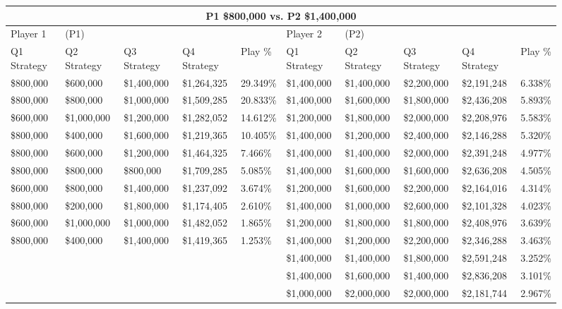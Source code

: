 \documentclass[11pt]{article}
\begin{document}
\begin{figure}
\tiny
\begin{tabular}{ |p{1.0cm}p{1.0cm}p{1.0cm}p{2.0cm}|p{1.0cm}||p{1.0cm}p{1.0cm}p{1.0cm}p{2.0cm}|p{1.0cm}|}
\hline
\multicolumn{10}{|c|}{P1 \$800,000 vs. P2 \$1,400,000} \\
\hline
Player 1 & (P1) & & & & Player 2 & (P2) & & & \\
\hline
Q1 Strategy & Q2 Strategy & Q3 Strategy & Q4 Strategy  &  Play \% & Q1 Strategy & Q2 Strategy & Q3 Strategy & Q4 Strategy  &  Play \%\\
\hline
\$800,000 & \$600,000 & \$1,400,000 & \$1,264,325 & 29.349\% & \$1,400,000 & \$1,400,000 & \$2,200,000 & \$2,191,248 & 6.338\% \\
\$800,000 & \$800,000 & \$1,000,000 & \$1,509,285 & 20.833\% & \$1,400,000 & \$1,600,000 & \$1,800,000 & \$2,436,208 & 5.893\% \\
\$600,000 & \$1,000,000 & \$1,200,000 & \$1,282,052 & 14.612\% & \$1,200,000 & \$1,800,000 & \$2,000,000 & \$2,208,976 & 5.583\% \\
\$800,000 & \$400,000 & \$1,600,000 & \$1,219,365 & 10.405\% & \$1,400,000 & \$1,200,000 & \$2,400,000 & \$2,146,288 & 5.320\% \\
\$800,000 & \$600,000 & \$1,200,000 & \$1,464,325 & 7.466\% & \$1,400,000 & \$1,400,000 & \$2,000,000 & \$2,391,248 & 4.977\% \\
\$800,000 & \$800,000 & \$800,000 & \$1,709,285 & 5.085\% & \$1,400,000 & \$1,600,000 & \$1,600,000 & \$2,636,208 & 4.505\% \\
\$600,000 & \$800,000 & \$1,400,000 & \$1,237,092 & 3.674\% & \$1,200,000 & \$1,600,000 & \$2,200,000 & \$2,164,016 & 4.314\% \\
\$800,000 & \$200,000 & \$1,800,000 & \$1,174,405 & 2.610\% & \$1,400,000 & \$1,000,000 & \$2,600,000 & \$2,101,328 & 4.023\% \\
\$600,000 & \$1,000,000 & \$1,000,000 & \$1,482,052 & 1.865\% & \$1,200,000 & \$1,800,000 & \$1,800,000 & \$2,408,976 & 3.639\% \\
\$800,000 & \$400,000 & \$1,400,000 & \$1,419,365 & 1.253\% & \$1,400,000 & \$1,200,000 & \$2,200,000 & \$2,346,288 & 3.463\% \\
& & & & & \$1,400,000 & \$1,400,000 & \$1,800,000 & \$2,591,248 & 3.252\% \\
& & & & & \$1,400,000 & \$1,600,000 & \$1,400,000 & \$2,836,208 & 3.101\% \\
& & & & & \$1,000,000 & \$2,000,000 & \$2,000,000 & \$2,181,744 & 2.967\% \\

\end{tabular}
\end{figure}
\end{document}
